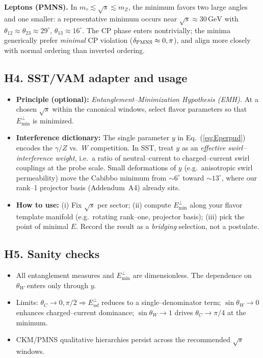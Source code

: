 \documentclass[11pt]{article}
\begin{document}
      \textbf{Leptons (PMNS).}
      In $m_\tau\lesssim\sqrt s\lesssim m_Z$, the minimum favors two large angles and one smaller: a representative minimum occurs near $\sqrt s\approx 30\,\mathrm{GeV}$ with $\theta_{12}\approx\theta_{23}\approx 29^{\circ}$, $\theta_{13}\approx 16^{\circ}$. The CP phase enters nontrivially; the minima generically prefer \emph{minimal} CP violation ($\delta_{\rm PMNS}\approx 0,\pi$), and align more closely with normal ordering than inverted ordering.

  \subsection*{H4. SST/VAM adapter and usage}

      \begin{itemize}
      \item \textbf{Principle (optional):} \emph{Entanglement–Minimization Hypothesis (EMH).} At a chosen $\sqrt s$ within the canonical windows, select flavor parameters so that $E^{\perp}_{\min}$ is minimized.
      \item \textbf{Interference dictionary:} The single parameter $y$ in Eq.~(\ref{eq:Eperpud}) encodes the $\gamma/Z$ vs.\ $W$ competition. In SST, treat $y$ as an \emph{effective swirl–interference weight}, i.e.\ a ratio of neutral–current to charged–current swirl couplings at the probe scale. Small deformations of $y$ (e.g.\ anisotropic swirl permeability) move the Cabibbo minimum from $\sim 6^{\circ}$ toward $\sim 13^{\circ}$, where our rank–1 projector basis (Addendum~A4) already sits.
      \item \textbf{How to use:} (i) Fix $\sqrt s$ per sector; (ii) compute $E^{\perp}_{\min}$ along your flavor template manifold (e.g.\ rotating rank–one, projector basis); (iii) pick the point of minimal $E$. Record the result as a \emph{bridging} selection, not a postulate.
      \end{itemize}

  \subsection*{H5. Sanity checks}

      \begin{itemize}
      \item All entanglement measures and $E^{\perp}_{\min}$ are dimensionless. The dependence on $\theta_W$ enters only through $y$.
      \item Limits: $\theta_C\to 0,\pi/2 \Rightarrow E^{\perp}_{ud}$ reduces to a single–denominator term; $\sin\theta_W\to 0$ enhances charged–current dominance; $\sin\theta_W\to 1$ drives $\theta_C\to \pi/4$ at the minimum.
      \item CKM/PMNS qualitative hierarchies persist across the recommended $\sqrt s$ windows.
      \end{itemize}
\end{document}
